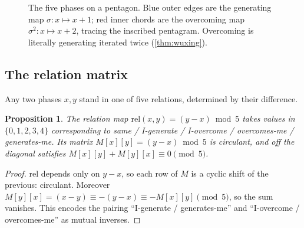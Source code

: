 \documentclass[11pt,a4paper]{article}
\newtheorem{proposition}[theorem]{Proposition}
\theoremstyle{definition}
\theoremstyle{remark}
\begin{document}
\begin{figure}[h]\centering
{}
\caption{The five phases on a pentagon. Blue outer edges are the generating map $\sigma:x\mapsto x+1$; red inner chords are the overcoming map $\sigma^2:x\mapsto x+2$, tracing the inscribed pentagram. Overcoming is literally generating iterated twice (\cref{thm:wuxing}).}\label{fig:wuxing}
\end{figure}

\subsection{The relation matrix}

Any two phases $x,y$ stand in one of five relations, determined by their difference.

\begin{proposition}\label{prop:relmatrix}
The relation map $\mathrm{rel}(x,y)=(y-x)\bmod 5$ takes values in $\{0,1,2,3,4\}$ corresponding to \emph{same / I-generate / I-overcome / overcomes-me / generates-me}. Its matrix $M[x][y]=(y-x)\bmod 5$ is circulant, and off the diagonal satisfies $M[x][y]+M[y][x]\equiv0\pmod 5$.
\end{proposition}
\begin{proof}
$\mathrm{rel}$ depends only on $y-x$, so each row of $M$ is a cyclic shift of the previous: circulant. Moreover $M[y][x]=(x-y)\equiv-(y-x)\equiv -M[x][y]\pmod 5$, so the sum vanishes. This encodes the pairing ``I-generate / generates-me'' and ``I-overcome / overcomes-me'' as mutual inverses.
\end{proof}
\end{document}
